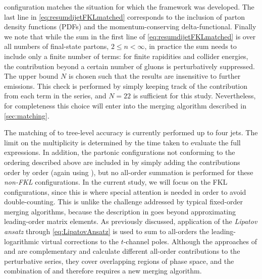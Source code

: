 configuration matches the situation for which the \HEJ framework was
developed. 
The last line in \cref{eq:resumdijetFKLmatched} corresponds to the inclusion of
parton density functions (PDFs) and the momentum-conserving delta-functional. 
Finally we note that while the sum in the first line of \cref{eq:resumdijetFKLmatched}
is over all numbers of final-state partons, $2 \leq n < \infty$, in practice
the sum needs to include only a finite number of terms: for
finite rapidities and collider energies, the contribution beyond a certain
number of gluons is perturbatively suppressed. The upper bound
$N$ is chosen such that the results are insensitive to further
emissions. This check is performed by simply keeping track of the
contribution from each term in the series, and $N=22$ is sufficient for this study.
Nevertheless, for completeness this choice will enter into the merging algorithm described in \cref{sec:matching}.

The matching of \HEJ to tree-level accuracy is currently
performed up to four jets. The limit on the multiplicity is determined by the time taken
to evaluate the full expressions.  
In addition, the partonic configurations not conforming to the ordering described above
are included in \HEJ by simply adding the contributions order by order (again
using \madgraph \cite{Alwall:2014hca}), but no all-order summation is
performed for these \emph{non-FKL} configurations. 
In the current study, we
will focus on the FKL configurations, since 
this is where special attention is needed in order to avoid double-counting.
This is unlike the challenge addressed by typical fixed-order merging algorithms, 
because the description in \HEJ goes
beyond approximating leading-order matrix elements.
As previously discussed, application of the \emph{Lipatov ansatz} through \cref{eq:LipatovAnsatz} is used to 
sum to all-orders the leading-logarithmic virtual corrections to the $t$-channel poles. 
Although the approaches of \HEJ and \py are complementary and 
calculate different all-order contributions to the perturbative series, 
they cover overlapping regions of phase space, and the
combination of \HEJ and \py therefore requires a new merging algorithm.

